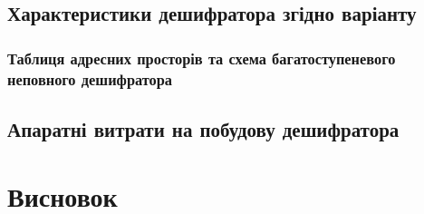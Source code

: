 \section{Характеристики дешифратора згідно варіанту}

\newpage
\subsection{Таблиця адресних просторів та схема багатоступеневого неповного дешифратора}

\newpage
%
\section{Апаратні витрати на побудову дешифратора}

\newpage
\chapter{Висновок}

